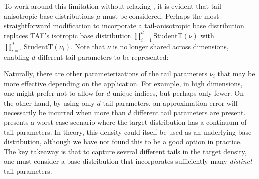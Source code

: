 \documentclass[../../thesis.tex]{subfiles}
\begin{document}
To work around this limitation without relaxing , it is evident
that tail-anisotropic base distributions $\mu$ must be considered. Perhaps the most straightforward modification to incorporate a tail-anisotropic base distribution replaces TAF's isotropic base distribution $\prod_{i=1}^d \text{StudentT}(\nu)$
with $\prod_{i=1}^d \text{StudentT}(\nu_i)$. Note that $\nu$ is no longer shared across dimensions,
enabling $d$ different tail parameters to be represented:




Naturally, there are other parameterizations of the tail parameters $\nu_i$ that may be more effective depending on the application. For example, in high dimensions, one might prefer not to allow for $d$ unique indices, but perhaps only fewer. On the other hand, by using only $d$ tail parameters, an approximation error will necessarily be incurred when more than $d$ different tail parameters are present.  presents a worst-case scenario where the target distribution has a continuum of tail parameters. In theory, this density could itself be used as an underlying base distribution, although we have not found this to be a good option in practice. The key takeaway is that to capture several different tails in the target density, one must consider a base distribution that incorporates sufficiently many \emph{distinct} tail parameters.
\end{document}
